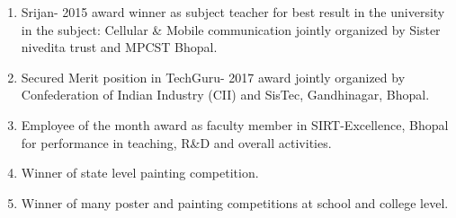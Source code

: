 %
%
%


\begin{enumerate}
	
	\item Srijan- 2015 award winner as subject teacher for best result in the university in the subject: Cellular \& Mobile communication jointly organized by Sister nivedita  trust and MPCST Bhopal.

	\item Secured Merit position in TechGuru- 2017 award jointly organized by Confederation of Indian Industry (CII) and SisTec, Gandhinagar, Bhopal.
	
	\item Employee of the month award as faculty member in SIRT-Excellence, Bhopal for performance in teaching, R\&D and overall activities.
	
	\item Winner of state level painting competition.
	\item Winner of many poster and painting competitions at school and college level.

\end{enumerate}
